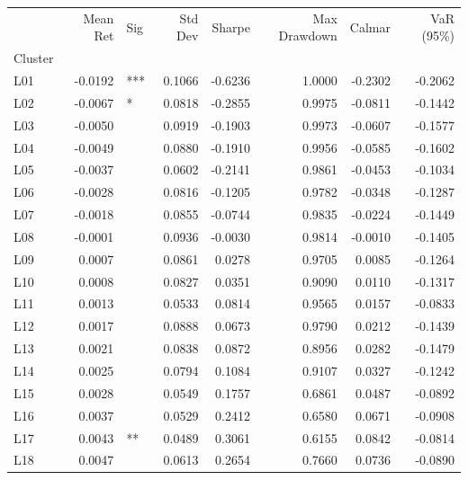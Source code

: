 \begin{tabular}{lrlrrrrr}
\toprule
{} &  Mean Ret &  Sig &  Std Dev &  Sharpe &  Max Drawdown &  Calmar &  VaR (95\%) \\
Cluster &           &      &          &         &               &         &            \\
\midrule
L01     &   -0.0192 &  *** &   0.1066 & -0.6236 &        1.0000 & -0.2302 &    -0.2062 \\
L02     &   -0.0067 &    * &   0.0818 & -0.2855 &        0.9975 & -0.0811 &    -0.1442 \\
L03     &   -0.0050 &      &   0.0919 & -0.1903 &        0.9973 & -0.0607 &    -0.1577 \\
L04     &   -0.0049 &      &   0.0880 & -0.1910 &        0.9956 & -0.0585 &    -0.1602 \\
L05     &   -0.0037 &      &   0.0602 & -0.2141 &        0.9861 & -0.0453 &    -0.1034 \\
L06     &   -0.0028 &      &   0.0816 & -0.1205 &        0.9782 & -0.0348 &    -0.1287 \\
L07     &   -0.0018 &      &   0.0855 & -0.0744 &        0.9835 & -0.0224 &    -0.1449 \\
L08     &   -0.0001 &      &   0.0936 & -0.0030 &        0.9814 & -0.0010 &    -0.1405 \\
L09     &    0.0007 &      &   0.0861 &  0.0278 &        0.9705 &  0.0085 &    -0.1264 \\
L10     &    0.0008 &      &   0.0827 &  0.0351 &        0.9090 &  0.0110 &    -0.1317 \\
L11     &    0.0013 &      &   0.0533 &  0.0814 &        0.9565 &  0.0157 &    -0.0833 \\
L12     &    0.0017 &      &   0.0888 &  0.0673 &        0.9790 &  0.0212 &    -0.1439 \\
L13     &    0.0021 &      &   0.0838 &  0.0872 &        0.8956 &  0.0282 &    -0.1479 \\
L14     &    0.0025 &      &   0.0794 &  0.1084 &        0.9107 &  0.0327 &    -0.1242 \\
L15     &    0.0028 &      &   0.0549 &  0.1757 &        0.6861 &  0.0487 &    -0.0892 \\
L16     &    0.0037 &      &   0.0529 &  0.2412 &        0.6580 &  0.0671 &    -0.0908 \\
L17     &    0.0043 &   ** &   0.0489 &  0.3061 &        0.6155 &  0.0842 &    -0.0814 \\
L18     &    0.0047 &      &   0.0613 &  0.2654 &        0.7660 &  0.0736 &    -0.0890 \\

\end{tabular}
